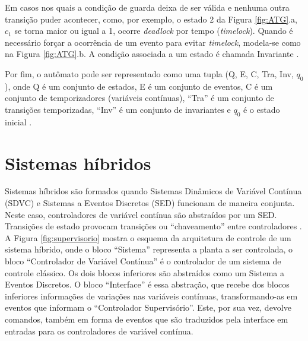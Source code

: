 Em casos nos quais a condição de guarda deixa de ser válida e nenhuma outra transição 
puder acontecer, como, por exemplo, o estado 2 da Figura \ref{fig:ATG}.a, $c_1$ se torna 
maior ou igual a 1, ocorre \textit{deadlock} por tempo (\textit{timelock}). Quando é 
necessário forçar a ocorrência de um evento para evitar \textit{timelock}, modela-se como 
na Figura \ref{fig:ATG}.b. A condição associada a um estado é chamada Invariante
\cite{book:SED}.


Por fim, o autômato pode ser representado como uma tupla (Q, E, C, Tra, Inv,
$q_0$), onde Q é um conjunto de estados, E é um conjunto de eventos, C é um
conjunto de temporizadores (variáveis contínuas), ``Tra'' é um conjunto de
transições temporizadas, ``Inv'' é um conjunto de invariantes e $q_0$ é o
estado inicial \cite{book:SED}.

\section{Sistemas híbridos \label{SEC:SISTEMASHIBRIDOS}}

Sistemas híbridos são formados quando Sistemas Dinâmicos de Variável
Contínua (SDVC) e Sistemas a Eventos Discretos (SED) funcionam de maneira
conjunta. Neste caso, controladores de variável contínua são abstraídos
por um SED. Transições de estado provocam transições ou ``chaveamento'' entre
controladores \cite{book:SED}. A Figura \ref{fig:supervisorio} mostra o esquema
da arquitetura de controle de um sistema híbrido, onde o bloco ``Sistema'' representa
a planta a ser controlada, o bloco ``Controlador de Variável Contínua'' é o controlador
de um sistema de controle clássico. Os dois blocos inferiores são abstraídos como um
Sistema a Eventos Discretos. O bloco ``Interface'' é essa abstração, que recebe
dos blocos inferiores informações de variações nas variáveis contínuas, transformando-as
em eventos que informam o ``Controlador Supervisório''. Este, por sua vez, devolve comandos,
também em forma de eventos que são traduzidos pela interface em entradas para os controladores
de variável contínua.  

